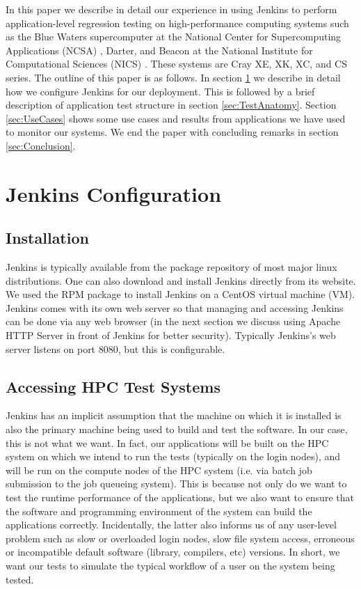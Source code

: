 \documentclass[AMA]{WileyNJD-v1}
\begin{document}
In this paper we describe in detail our experience in using Jenkins to perform application-level regression testing on high-performance computing systems such as the Blue Waters supercomputer at the National Center for Supercomputing Applications (NCSA) \cite{NCSA}, Darter, and Beacon at the National Institute for Computational Sciences (NICS) \cite{NICS}. 
These systems are Cray XE, XK, XC, and CS series. 
The outline of this paper is as follows. In section \ref{sec:JenkinsConfiguration} we describe in detail how we configure Jenkins for our deployment. This is followed by a brief description of application test structure in section \ref{sec:TestAnatomy}. Section \ref{sec:UseCases} shows some use cases and results from applications we have used to monitor our systems. We end the paper with concluding remarks in section \ref{sec:Conclusion}.


\section{Jenkins Configuration}
\label{sec:JenkinsConfiguration}

\subsection{Installation}
Jenkins is typically available from the package repository of most major linux distributions. 
One can also download and install Jenkins directly from its website. 
We used the RPM package to install Jenkins on a CentOS virtual machine (VM). 
Jenkins comes with its own web server so that managing and accessing Jenkins can be done via any web browser (in the next section we discuss using Apache HTTP Server in front of Jenkins for better security). 
Typically Jenkins's web server listens on port 8080, but this is configurable. 


\subsection{Accessing HPC Test Systems}
Jenkins has an implicit assumption that the machine on which it is installed is also the primary machine being used to build and test the software. 
In our case, this is not what we want. 
In fact, our applications will be built on the HPC system on which we intend to run the tests (typically on the login nodes), and will be run on the compute nodes of the HPC system (i.e. via batch job submission to the job queueing system). 
This is because not only do we want to test the runtime performance of the applications, but we also want to ensure that the software and programming environment of the system can build the applications correctly. 
Incidentally, the latter also informs us of any user-level problem such as slow or overloaded login nodes, slow file system access, erroneous or incompatible default software (library, compilers, etc) versions. 
In short, we want our tests to simulate the typical workflow of a user on the system being tested.
\end{document}
